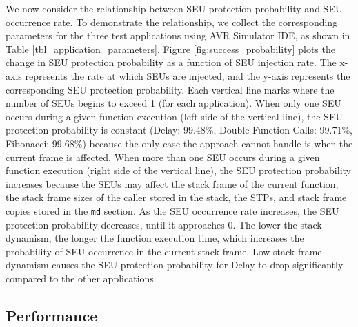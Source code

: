 We now consider the relationship between SEU protection probability and SEU occurrence rate. To demonstrate the relationship, we collect the corresponding parameters for the three test applications using AVR Simulator IDE, as shown in Table \ref{tbl_application_parameters}. Figure \ref{fig:success_probability} plots the change in SEU protection probability as a function of SEU injection rate. The x-axis represents the rate at which SEUs are injected, and the y-axis represents the corresponding SEU protection probability. Each vertical line marks where the number of SEUs begins to exceed 1 (for each application). When only one SEU occurs during a given function execution (left side of the vertical line), the SEU protection probability is constant (Delay: 99.48\%, Double Function Calls: 99.71\%, Fibonacci: 99.68\%) because the only case the approach cannot handle is when the current frame is affected. When more than one SEU occurs during a given function execution (right side of the vertical line), the SEU protection probability increases because the SEUs may affect the stack frame of the current function, the stack frame sizes of the caller stored in the stack, the STPs, and stack frame copies stored in the \texttt{md} section. As the SEU occurrence rate increases, the SEU protection probability decreases, until it approaches 0. The lower the stack dynamism, the longer the function execution time, which increases the probability of SEU occurrence in the current stack frame. Low stack frame dynamism causes the SEU protection probability for Delay to drop significantly compared to the other applications.

\subsection{Performance}

